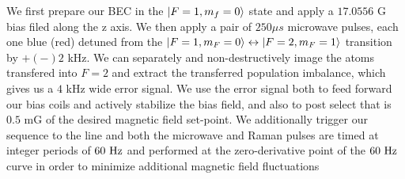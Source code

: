 We first prepare our BEC in the $|F=1, m_f=0\rangle$ state and apply a $17.0556$ G bias filed along the z axis. We then apply a pair of $250\mu s$ microwave pulses, each one blue (red) detuned from the $|F=1,m_F=0\rangle\leftrightarrow|F=2,m_F=1\rangle $ transition by $+(-)2$ kHz. We can separately and non-destructively image the atoms transfered into $F=2$ and extract the transferred population imbalance, which gives us a $4$ kHz wide error signal. We use the error signal both to feed forward our bias coils and actively stabilize the bias field, and also to post select that is $0.5$ mG of the desired magnetic field set-point. We additionally trigger our sequence to the line and both the microwave and Raman pulses are timed at integer periods of $60{\ {\rm Hz}}$ and performed at the zero-derivative point of the $60{\ {\rm Hz}}$ curve in order to minimize additional magnetic field fluctuations
